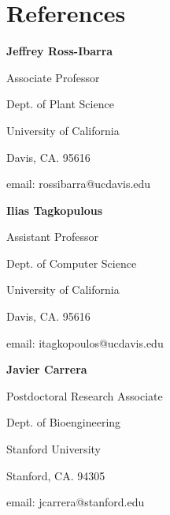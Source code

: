 \documentclass[letterpaper]{article}
\def\footerlink{https://github.com/arundurvasula/CV/blob/master/CV.pdf?raw=true}
\renewenvironment{itemize}{
  \begin{list}{}{
    \setlength{\leftmargin}{1.5em}
  }
}{
  \end{list}
}
\begin{document}

\section*{References}
\begin{itemize}
\item {\bf Jeffrey Ross-Ibarra}
\begin{itemize}
\item Associate Professor
\item Dept. of Plant Science
\item University of California
\item Davis, CA. 95616
\item email: rossibarra@ucdavis.edu 
\end{itemize}
\item {\bf Ilias Tagkopulous}
\begin{itemize}
\item Assistant Professor
\item Dept. of Computer Science
\item University of California
\item Davis, CA. 95616
\item email: itagkopoulos@ucdavis.edu 
\end{itemize}
\item {\bf Javier Carrera}
\begin{itemize}
\item Postdoctoral Research Associate
\item Dept. of Bioengineering
\item Stanford University
\item Stanford, CA. 94305
\item email: jcarrera@stanford.edu
\end{itemize}
\end{itemize}

\end{document}
